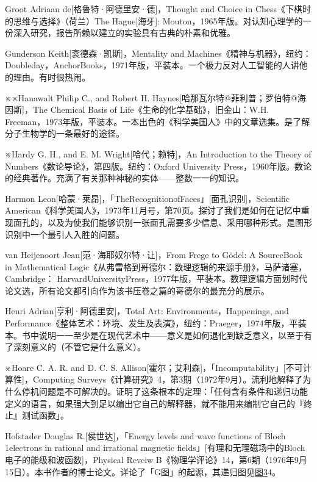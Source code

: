 \documentclass[
  12pt,
  twoside,
  openright,
  oldfontcommands,
]{memoir}
\begin{document}
Groot Adriaan de{[}格鲁特·阿德里安·德{]}，Thought and Choice in
Chess《下棋时的思维与选择》（荷兰）The Hague{[}海牙{]}:
Mouton，1965年版。对认知心理学的一份深入研究，报告所赖以建立的实验具有古典的朴素和优雅。

Gunderson Keith{[}衮德森·凯斯{]}，Mentality and
Machines《精神与机器》，纽约：Doubleday，AnchorBooks，1971年版，平装本。一个极力反对人工智能的人讲他的理由。有时很热闹。

※※Hanawalt Philip C., and Robert H.
Haynes{[}哈那瓦尔特@菲利普；罗伯特@海因斯{]}，The Chemical Basis of
Life《生命的化学基础》，旧金山：W.H.
Freeman，1973年版，平装本。一本出色的《科学美国人》中的文章选集。是了解分子生物学的一条最好的途径。

※Hardy G. H., and E. M. Wright{[}哈代；赖特{]}，An Introduction to the
Theory of Numbers《数论导论》，第四版。纽约：Oxford University
Press，1960年版。数论的经典著作。充满了有关那种神秘的实体------整数一一的知识。

Harmon
Leon{[}哈蒙·莱昂{]}，「TheRecognitionofFaces」{[}面孔识别{]}，Scientific
American《科学美国人》，1973年11月号，第70页。探讨了我们是如何在记忆中重现面孔的，以及为使我们能够识别一张面孔需要多少信息、采用哪种形式。是图形识别中一个最引人入胜的问题。

van Heijenoort Jean{[}范·海耶奴尔特·让{]}，From Frege to Gödel: A
SourceBook in Mathematical
Logic《从弗雷格到哥德尔：数理逻辑的来源手册》，马萨诸塞，Cambridge：
HarvardUniversityPress，1977年版，平装本。数理逻辑方面划时代论文选，所有论文都引向作为该书压卷之篇的哥德尔的最充分的展示。

Henri Adrian{[}亨利·阿德里安{]}，Total Art: Environments，Happenings,
and
Performance《整体艺术：环境、发生及表演》，纽约：Praeger，1974年版，平装本。书中说明一一至少是在现代艺术中------意义是如何退化到缺乏意义，以至于有了深刻意义的（不管它是什么意义）。

※Hoare C. A. R. and D. C. S.
Allison{[}霍尔；艾利森{]}，「Incomputability」{[}不可计算性{]}，Computing
Surveys《计算研究》4，第3期（1972年9月）。流利地解释了为什么停机问题是不可解决的。证明了这条根本的定理：「任何含有条件和递归功能定义的语言，如果强大到足以编出它自己的解释器，就不能用来编制它自己的『终止』测试函数」。

Hofstader Douglas R.{[}侯世达{]}，「Energy levels and wave functions of
Bloch 1electrons in rational and irrational magnetic
fields」{[}有理和无理磁场中的Bloch电子的能级和波函数{]}，Physical Reveiw
B《物理学评论》14，第6期（1976年9月15日）。本书作者的博士论文。详论了「G图」的起源，其递归图见\hyperref[fig:3]{图3}4。
\end{document}
